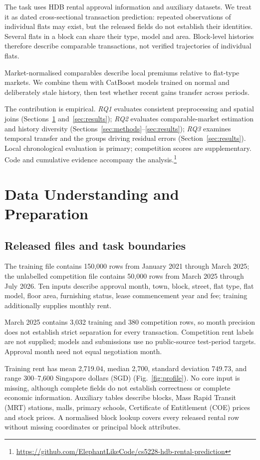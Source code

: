 \documentclass[conference]{IEEEtran}
\begin{document}
The task uses HDB rental approval information and auxiliary datasets. We treat it as dated cross-sectional transaction prediction: repeated observations of individual flats may exist, but the released fields do not establish their identities. Several flats in a block can share their type, model and area. Block-level histories therefore describe comparable transactions, not verified trajectories of individual flats.

Market-normalised comparables describe local premiums relative to flat-type markets. We combine them with CatBoost models trained on normal and deliberately stale history, then test whether recent gains transfer across periods.

The contribution is empirical. \textit{RQ1} evaluates consistent preprocessing and spatial joins (Sections~\ref{sec:data_preparation} and~\ref{sec:results}); \textit{RQ2} evaluates comparable-market estimation and history diversity (Sections~\ref{sec:methods}--\ref{sec:results}); \textit{RQ3} examines temporal transfer and the groups driving residual errors (Section~\ref{sec:results}). Local chronological evaluation is primary; competition scores are supplementary. Code and cumulative evidence accompany the analysis.\footnote{\url{https://github.com/ElephantLikeCode/cs5228-hdb-rental-prediction}}

\section{Data Understanding and Preparation}\label{sec:data_preparation}
\subsection{Released files and task boundaries}
The training file contains 150,000 rows from January 2021 through March 2025; the unlabelled competition file contains 50,000 rows from March 2025 through July 2026. Ten inputs describe approval month, town, block, street, flat type, flat model, floor area, furnishing status, lease commencement year and fee; training additionally supplies monthly rent.

March 2025 contains 3,032 training and 380 competition rows, so month precision does not establish strict separation for every transaction. Competition rent labels are not supplied; models and submissions use no public-source test-period targets. Approval month need not equal negotiation month.

Training rent has mean 2,719.04, median 2,700, standard deviation 749.73, and range 300--7,600 Singapore dollars (SGD) (Fig.~\ref{fig:profile}). No core input is missing, although complete fields do not establish correctness or complete economic information. Auxiliary tables describe blocks, Mass Rapid Transit (MRT) stations, malls, primary schools, Certificate of Entitlement (COE) prices and stock prices. A normalised block lookup covers every released rental row without missing coordinates or principal block attributes.
\end{document}
